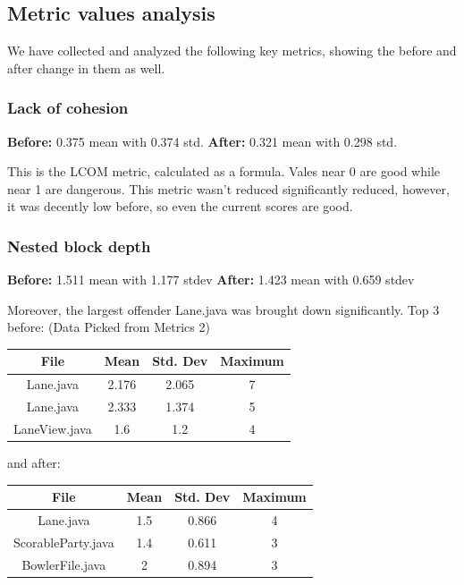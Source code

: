 \subsection{Metric values analysis}

We have collected and analyzed the following key metrics, showing the before and after change in them as well.

\subsubsection{Lack of cohesion}

\textbf{Before:} 0.375 mean with 0.374 std.
\textbf{After:} 0.321 mean with 0.298 std.

This is the LCOM metric, calculated as a formula. Vales near 0 are good while near 1 are dangerous. This metric wasn't reduced significantly reduced, however, it was decently low before, so even the current scores are good.

\subsubsection{Nested block depth}
\textbf{Before:} 1.511 mean with 1.177 stdev
\textbf{After:} 1.423 mean with 0.659 stdev

Moreover, the largest offender Lane.java was brought down significantly. Top 3 before:
(Data Picked from Metrics 2)

\begin{tabular}{ |c|c|c|c| }
    \hline
    \textbf{File} & \textbf{Mean} & \textbf{Std. Dev} & \textbf{Maximum} \\
    \hline
    Lane.java     & 2.176         & 2.065             & 7                \\
    Lane.java     & 2.333         & 1.374             & 5                \\
    LaneView.java & 1.6           & 1.2               & 4                \\
    \hline
\end{tabular}

and after:

\begin{tabular}{ |c|c|c|c| }
    \hline
    \textbf{File}      & \textbf{Mean} & \textbf{Std. Dev} & \textbf{Maximum} \\
    \hline
    Lane.java          & 1.5           & 0.866             & 4                \\
    ScorableParty.java & 1.4           & 0.611             & 3                \\
    BowlerFile.java    & 2             & 0.894             & 3                \\
    \hline
\end{tabular}

